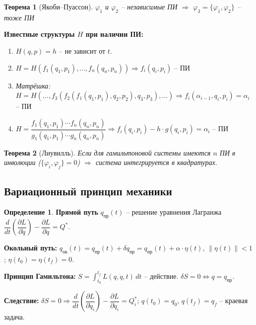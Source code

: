 \documentclass[12pt, a4paper]{article}
\theoremstyle{plain}
\newtheorem{theorem}{Теорема}[section] %
\theoremstyle{definition}
\newtheorem{definition}{Определение}[section]
\theoremstyle{remark}
\begin{document}
\begin{theorem}[Якоби--Пуассон]
$\varphi_1$ и $\varphi_2$ -- независимые ПИ $\Rightarrow$ $\varphi_3 = \{\varphi_1, \varphi_2\}$ -- тоже ПИ
   
\end{theorem}




\textbf{Известные структуры $H$ при наличии ПИ:}
\begin{enumerate}
    \item $H(q, p) = h$ -- не зависит от $t$.
    \item $H = H(f_1(q_1, p_1), \ldots, f_n(q_n, p_n)) \Rightarrow f_i(q_i, p_i)$ -- ПИ
    \item \textit{Матрёшка:} $H = H(\ldots, f_3(f_2(f_1(q_1, p_1), q_2, p_2), q_3, p_3), \ldots) \Rightarrow f_i(\alpha_{i-1}, q_i, p_i) = \alpha_i$ -- ПИ
    \item $H = \dfrac{f_1(q_1, p_1) \cdots f_n(q_n, p_n)}{g_1(q_1, p_1) \cdots g_n(q_n, p_n)} \Rightarrow f_i(q_i, p_i) - h \cdot g(q_i, p_i) = \alpha_i$ -- ПИ
\end{enumerate}

\begin{theorem}[Лиувилль]
Если для гамильтоновой системы имеются $n$ ПИ в инволюции ($\{\varphi_i, \varphi_j\} = 0$) $\Rightarrow$ система интегрируется в квадратурах.
    
\end{theorem}

\subsection{Вариационный принцип механики}
\begin{definition}
\textbf{Прямой путь} $q_{\text{пр}}(t)$ -- решение уравнения Лагранжа $\dfrac{d}{dt}\left(\dfrac{\partial L}{\partial \dot{q}}\right) - \dfrac{\partial L}{\partial q} = Q^*$.
    
\end{definition}

\textbf{Окольный путь:} $q_{\text{ок}}(t) = q_{\text{пр}}(t) + \delta q_{\text{пр}} = q_{\text{пр}}(t) + \alpha \cdot \eta(t)$, $\|\eta(t)\| < 1$; $\eta(t_0) = \eta(t_f) = 0$.

\textbf{Принцип Гамильтона:} $S = \displaystyle\int_{t_0}^{t_f} L(q, \dot{q}, t)\, dt$ -- действие. $\delta S = 0 \Leftrightarrow q = q_{\text{пр}}$.

\textbf{Следствие:} $\delta S = 0 \Rightarrow \dfrac{d}{dt}\left(\dfrac{\partial L}{\partial \dot{q}_i}\right) - \dfrac{\partial L}{\partial q_i} = Q_i^*$; $q(t_0) = q_0$, $q(t_f) = q_f$ -- краевая задача.
\end{document}
